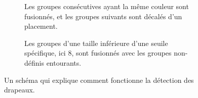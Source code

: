 \documentclass{article}
\begin{document}
\begin{figure}[!ht]
\begin{subfigure}{\textwidth}
            \caption{Les groupes consécutives ayant la même couleur sont fusionnés, et les groupes suivants sont décalés d'un placement.}
        \end{subfigure}

        \vspace{5mm}

        \begin{subfigure}{\textwidth}
            \begin{center}
            \end{center}

            \caption{Les groupes d'une taille inférieure d'une seuile spécifique, ici 8, sont fusionnés avec les groupes non-définis entourants.}
        \end{subfigure}
        \caption{Un schéma qui explique comment fonctionne la détection des drapeaux.}
    \end{figure}
\end{document}
